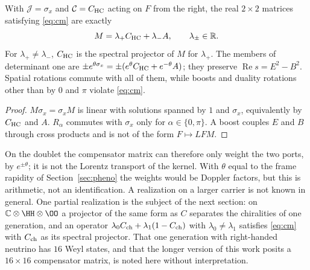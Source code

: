 \begin{proposition}\label{prop:cm-doublet}
With \(\mathcal J=\sigma_x\) and \(\mathcal C=C_{\rm HC}\) acting on \(F\) from the right, the real \(2\times2\) matrices satisfying \eqref{eq:cm} are exactly
\[
M=\lambda_+C_{\rm HC}+\lambda_-A,\qquad \lambda_\pm\in\mathbb R .
\]
For \(\lambda_+\neq\lambda_-\), \(C_{\rm HC}\) is the spectral projector of \(M\) for \(\lambda_+\).  The members of determinant one are
\(\pm e^{\theta\sigma_x}=\pm(e^{\theta}C_{\rm HC}+e^{-\theta}A)\); they preserve \(\operatorname{Re}s=E^2-B^2\).  Spatial rotations commute with all of them, while boosts
and duality rotations other than by \(0\) and \(\pi\) violate \eqref{eq:cm}.
\end{proposition}

\begin{proof}
\(M\sigma_x=\sigma_xM\) is linear with solutions spanned by \(1\) and \(\sigma_x\), equivalently by \(C_{\rm HC}\) and \(A\).  \(R_\alpha\) commutes with
\(\sigma_x\) only for \(\alpha\in\{0,\pi\}\).  A boost couples \(E\) and \(B\) through cross products and is not of the form \(F\mapsto LFM\).
\end{proof}

On the doublet the compensator matrix can therefore only weight the two ports, by \(e^{\pm\theta}\); it is not the Lorentz transport of the
kernel.  With \(\theta\) equal to the frame rapidity of Section~\ref{sec:pheno} the weights would be Doppler factors, but this is arithmetic,
not an identification.  A realization on a larger carrier is not known in general.  One partial realization is the subject of the next
section: on \(\mathbb C\otimes\HH\otimes\OO\) a projector of the same form as \(C\) separates the chiralities of one generation, and an operator
\(\lambda_0C_{\rm ch}+\lambda_1(1-C_{\rm ch})\) with \(\lambda_0\neq\lambda_1\) satisfies \eqref{eq:cm} with \(C_{\rm ch}\) as its spectral projector.
That one generation with right-handed neutrino has \(16\) Weyl states, and that the longer version of this work posits a \(16\times16\)
compensator matrix, is noted here without interpretation.
